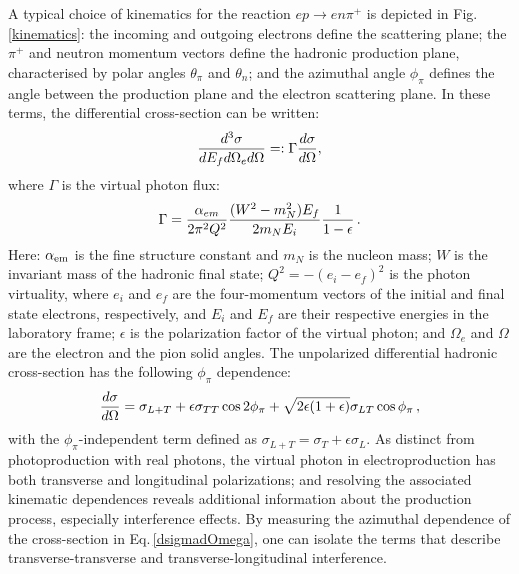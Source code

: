 A typical choice of kinematics for the reaction $ep\to en\pi^+$ is depicted in Fig.\,\ref{kinematics}: the incoming and outgoing electrons define the scattering plane; the $\pi^+$ and neutron momentum vectors define the hadronic production plane, characterised by polar angles $\theta_{\pi}$ and $\theta_n$; and the azimuthal angle $\phi_\pi$ defines the angle between the production plane and the electron scattering plane.  In these terms, the differential cross-section can be written:
\begin{equation}
{d^3\sigma \over dE_f d\Omega_e d\Omega} =: {\Gamma {d\sigma \over d\Omega}},
\end{equation}
where $\Gamma$ is the virtual photon flux:
\begin{equation}
\Gamma = {\alpha_{em} \over 2\pi^2Q^2} {(W^2 - m_N^2)E_f \over 2m_NE_i} {1\over 1-\epsilon}\,.
\end{equation}
Here: $\alpha_{\rm em}$ is the fine structure constant and $m_N$ is the nucleon mass; $W$ is the invariant mass of the hadronic final state; $Q^2=-(e_i - e_f)^2$ is the photon virtuality, where $e_i$ and $e_f$ are the four-momentum vectors of the initial and final state electrons, respectively, and $E_i$ and $E_f$ are their respective energies in the laboratory frame; $\epsilon$ is the polarization factor of the virtual photon; and $\Omega_e$ and $\Omega$ are the electron and the pion solid angles.  The unpolarized differential hadronic cross-section has the following $\phi_\pi$ dependence:
\begin{equation}
\label{dsigmadOmega}
 {d\sigma \over d\Omega} = \sigma_{L+T} + \epsilon \sigma_{TT}\cos{2\phi_\pi} + \sqrt{2\epsilon(1+\epsilon)}\sigma_{LT}\cos{\phi_\pi}\,,
\end{equation}
with the $\phi_\pi$-independent term defined as
 $\sigma_{L+T} = \sigma_T + \epsilon \sigma_L$.
As distinct from photoproduction with real photons, the virtual photon in electroproduction has both transverse and longitudinal polarizations; and resolving the associated kinematic dependences reveals additional information about the  production process, especially interference effects.  By measuring the azimuthal dependence of the cross-section in Eq.\,\eqref{dsigmadOmega}, one can isolate the terms that describe transverse-transverse and transverse-longitudinal interference.  %

